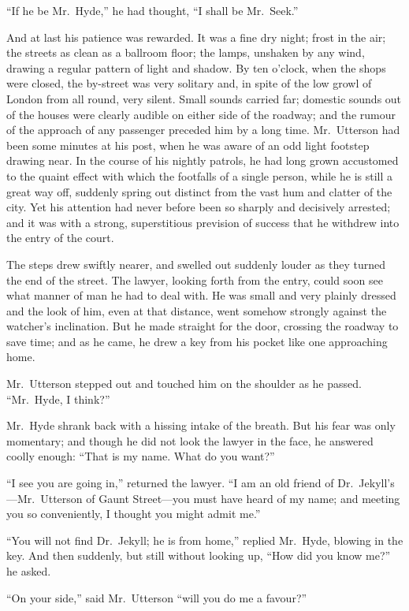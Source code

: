 \documentclass[12pt,openright]{book}
\begin{document}
“If he be Mr. Hyde,” he had thought, “I shall be Mr. Seek.”

And at last his patience was rewarded. It was a fine dry night; frost in the air; the streets as clean as a ballroom floor; the lamps, unshaken by any wind, drawing a regular pattern of light and shadow. By ten o’clock, when the shops were closed, the by-street was very solitary and, in spite of the low growl of London from all round, very silent. Small sounds carried far; domestic sounds out of the houses were clearly audible on either side of the roadway; and the rumour of the approach of any passenger preceded him by a long time. Mr. Utterson had been some minutes at his post, when he was aware of an odd light footstep drawing near. In the course of his nightly patrols, he had long grown accustomed to the quaint effect with which the footfalls of a single person, while he is still a great way off, suddenly spring out distinct from the vast hum and clatter of the city. Yet his attention had never before been so sharply and decisively arrested; and it was with a strong, superstitious prevision of success that he withdrew into the entry of the court.

The steps drew swiftly nearer, and swelled out suddenly louder as they turned the end of the street. The lawyer, looking forth from the entry, could soon see what manner of man he had to deal with. He was small and very plainly dressed and the look of him, even at that distance, went somehow strongly against the watcher’s inclination. But he made straight for the door, crossing the roadway to save time; and as he came, he drew a key from his pocket like one approaching home.

Mr. Utterson stepped out and touched him on the shoulder as he passed. “Mr. Hyde, I think?”

Mr. Hyde shrank back with a hissing intake of the breath. But his fear was only momentary; and though he did not look the lawyer in the face, he answered coolly enough: “That is my name. What do you want?”

“I see you are going in,” returned the lawyer. “I am an old friend of Dr. Jekyll’s—Mr. Utterson of Gaunt Street—you must have heard of my name; and meeting you so conveniently, I thought you might admit me.”

“You will not find Dr. Jekyll; he is from home,” replied Mr. Hyde, blowing in the key. And then suddenly, but still without looking up, “How did you know me?” he asked.

“On your side,” said Mr. Utterson “will you do me a favour?”
\end{document}
